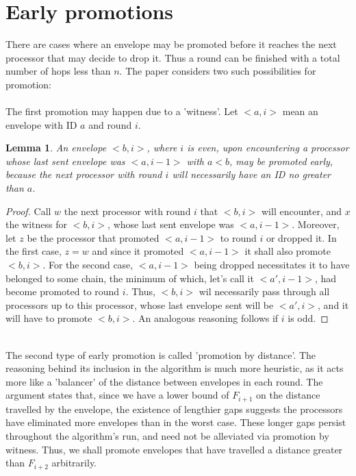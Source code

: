 \documentclass{article}
\newtheorem{lemma}{Lemma}
\begin{document}
\section{Early promotions}
There are cases where an envelope may be promoted before it reaches the next processor that may decide to drop it. Thus a round can be finished with a total number of hops less than $n$. The paper considers two such possibilities for promotion:
\\\\
The first promotion may happen due to a 'witness'. Let $<a, i>$ mean an envelope with ID $a$ and round $i$.
\begin{lemma} 
    An envelope $<b, i>$, where $i$ is even, upon encountering a processor whose last sent envelope was $<a, i-1>$ with $a < b$, may be promoted early, because the next processor with round $i$ will necessarily have an ID no greater than $a$.
\end{lemma}
\begin{proof}
Call $w$ the next processor with round $i$ that $<b, i>$ will encounter, and $x$ the witness for $<b, i>$, whose last sent envelope was $<a, i-1>$. Moreover, let $z$ be the processor that promoted $<a, i-1>$ to round $i$ or dropped it. In the first case, $z = w$ and since it promoted $<a, i-1>$ it shall also promote $<b, i>$. For the second case, $<a, i-1>$ being dropped necessitates it to have belonged to some chain, the minimum of which, let's call it $<a', i-1>$, had become promoted to round $i$. Thus, $<b, i>$ wil necessarily pass through all processors up to this processor, whose last envelope sent will be $<a', i>$, and it will have to promote $<b, i>$. An analogous reasoning follows if $i$ is odd.
\end{proof}
\leavevmode
\\
The second type of early promotion is called 'promotion by distance'. The reasoning behind its inclusion in the algorithm is much more heuristic, as it acts more like a 'balancer' of the distance between envelopes in each round. The argument states that, since we have a lower bound of $F_{i+1}$ on the distance travelled by the envelope, the existence of lengthier gaps suggests the processors have eliminated more envelopes than in the worst case. These longer gaps persist throughout the algorithm's run, and need not be alleviated via promotion by witness. Thus, we shall promote envelopes that have travelled a distance greater than $F_{i+2}$ arbitrarily.
\\\\
\newpage
\end{document}
